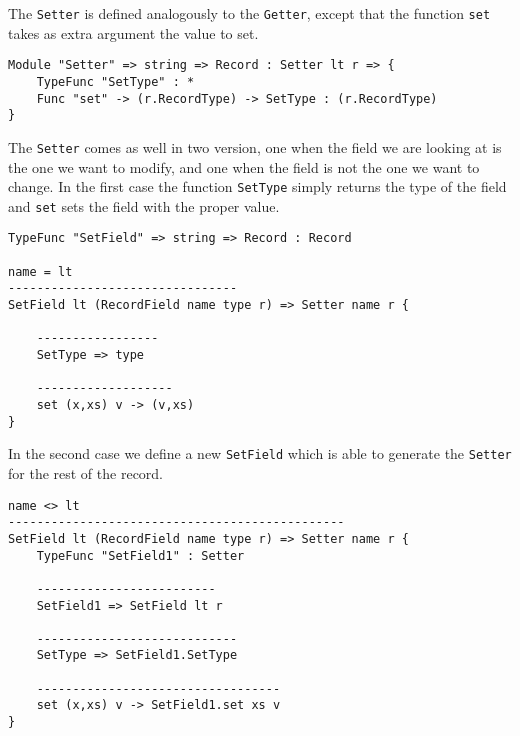 The \texttt{Setter} is defined analogously to the \texttt{Getter}, except that the function \texttt{set} takes as extra argument the value to set.

\begin{lstlisting}
Module "Setter" => string => Record : Setter lt r => {
	TypeFunc "SetType" : *
	Func "set" -> (r.RecordType) -> SetType : (r.RecordType) 
}
\end{lstlisting}

The \texttt{Setter} comes as well in two version, one when the field we are looking at is the one we want to modify, and one when the field is not the one we want to change. In the first case the function \texttt{SetType} simply returns the type of the field and \texttt{set} sets the field with the proper value.

\begin{lstlisting}
TypeFunc "SetField" => string => Record : Record

name = lt
--------------------------------
SetField lt (RecordField name type r) => Setter name r {

	-----------------
	SetType => type
	
	-------------------
	set (x,xs) v -> (v,xs)
}
\end{lstlisting}

In the second case we define a new \texttt{SetField} which is able to generate the \texttt{Setter} for the rest of the record. 

\begin{lstlisting}
name <> lt
-----------------------------------------------
SetField lt (RecordField name type r) => Setter name r {
	TypeFunc "SetField1" : Setter
	
	-------------------------
	SetField1 => SetField lt r
	
	----------------------------
	SetType => SetField1.SetType
	
	----------------------------------
	set (x,xs) v -> SetField1.set xs v
}
\end{lstlisting}
